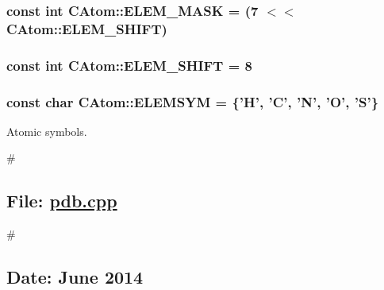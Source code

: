 \hypertarget{classCAtom_aa97b0aef40ff8616ad51269c3bd50070}{
\subsubsection[{E\-L\-E\-M\-\_\-\-M\-A\-S\-K}]{\setlength{\rightskip}{0pt plus 5cm}const int C\-Atom\-::\-E\-L\-E\-M\-\_\-\-M\-A\-S\-K = (7 $<$$<$ {\bf C\-Atom\-::\-E\-L\-E\-M\-\_\-\-S\-H\-I\-F\-T})\hspace{0.3cm}{\ttfamily [static]}}}\label{classCAtom_aa97b0aef40ff8616ad51269c3bd50070}
\hypertarget{classCAtom_a8d1a901dcaeab90596ffacac7bc04f3d}{
\subsubsection[{E\-L\-E\-M\-\_\-\-S\-H\-I\-F\-T}]{\setlength{\rightskip}{0pt plus 5cm}const int C\-Atom\-::\-E\-L\-E\-M\-\_\-\-S\-H\-I\-F\-T = 8\hspace{0.3cm}{\ttfamily [static]}}}\label{classCAtom_a8d1a901dcaeab90596ffacac7bc04f3d}
\hypertarget{classCAtom_a4c2f1a2299fb0ffbdb1307f744591baf}{
\subsubsection[{E\-L\-E\-M\-S\-Y\-M}]{\setlength{\rightskip}{0pt plus 5cm}const char C\-Atom\-::\-E\-L\-E\-M\-S\-Y\-M = \{'{\bf H}', '{\bf C}', '{\bf N}', '{\bf O}', '{\bf S}'\}\hspace{0.3cm}{\ttfamily [static]}}}\label{classCAtom_a4c2f1a2299fb0ffbdb1307f744591baf}


Atomic symbols. 

\# \subsection*{File\-: \hyperlink{pdb_8cpp}{pdb.\-cpp}}

\# \subsection*{Date\-: June 2014}

